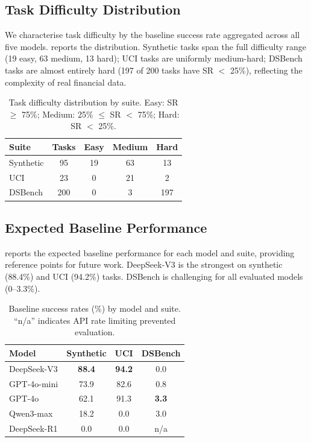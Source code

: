 \subsection{Task Difficulty Distribution}
\label{app:difficulty}

We characterise task difficulty by the baseline success rate aggregated across all five models.  reports the distribution. Synthetic tasks span the full difficulty range (19 easy, 63 medium, 13 hard); UCI tasks are uniformly medium-hard; DSBench tasks are almost entirely hard (197 of 200 tasks have SR $<$ 25\%), reflecting the complexity of real financial data.

\begin{table}[t]
\centering
\caption{Task difficulty distribution by suite. Easy: SR $\geq$ 75\%; Medium: 25\% $\leq$ SR $<$ 75\%; Hard: SR $<$ 25\%.}
\label{tab:difficulty}
\small
\begin{tabular}{@{}lcccc@{}}
\toprule
Suite & Tasks & Easy & Medium & Hard \\
\midrule
Synthetic & 95 & 19 & 63 & 13 \\
UCI & 23 & 0 & 21 & 2 \\
DSBench & 200 & 0 & 3 & 197 \\
\bottomrule
\end{tabular}
\end{table}

\subsection{Expected Baseline Performance}
\label{app:baselines}

 reports the expected baseline performance for each model and suite, providing reference points for future work. DeepSeek-V3 is the strongest on synthetic (88.4\%) and UCI (94.2\%) tasks. DSBench is challenging for all evaluated models (0--3.3\%).\begin{table}[t]
\centering
\caption{Baseline success rates (\%) by model and suite. ``n/a'' indicates API rate limiting prevented evaluation.}
\label{tab:baselines}
\small
\begin{tabular}{@{}lccc@{}}
\toprule
Model & Synthetic & UCI & DSBench \\
\midrule
DeepSeek-V3 & \textbf{88.4} & \textbf{94.2} & 0.0 \\
GPT-4o-mini & 73.9 & 82.6 & 0.8 \\
GPT-4o & 62.1 & 91.3 & \textbf{3.3} \\
Qwen3-max & 18.2 & 0.0 & 3.0 \\
DeepSeek-R1 & 0.0 & 0.0 & n/a \\
\bottomrule
\end{tabular}
\end{table}

